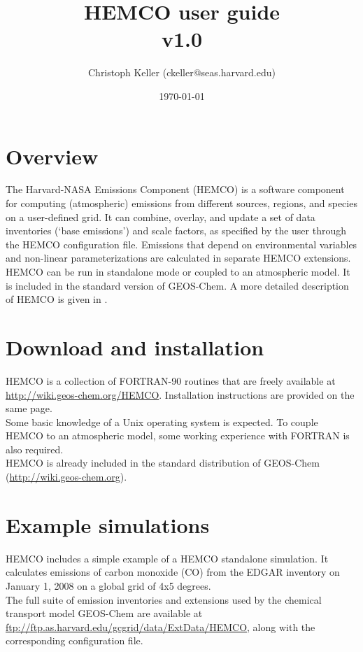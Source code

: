 \documentclass[12pt,a4paper]{article} %
\begin{document}

\title{HEMCO user guide\\v1.0}
\date{\today}
\author{Christoph Keller (ckeller@seas.harvard.edu)}

\maketitle
\tableofcontents

\section{Overview} \label{Overview}
The Harvard-NASA Emissions Component (HEMCO) is a software component for computing (atmospheric) emissions from different sources, regions, and species on a user-defined grid. It can combine, overlay, and update a set of data inventories (‘base emissions’) and scale factors, as specified by the user through the HEMCO configuration file. Emissions that depend on environmental variables and non-linear parameterizations are calculated in separate HEMCO extensions. HEMCO can be run in standalone mode or coupled to an atmospheric model. It is included in the standard version of GEOS-Chem. A more detailed description of HEMCO is given in \cite{Keller_2014}.

\section{Download and installation} \label{Installation}
HEMCO is a collection of FORTRAN-90 routines that are freely available at \url{http://wiki.geos-chem.org/HEMCO}. Installation instructions are provided on the same page.\\
Some basic knowledge of a Unix operating system is expected. To couple HEMCO to an atmospheric model, some working experience with FORTRAN is also required.\\
HEMCO is already included in the standard distribution of GEOS-Chem (\url{http://wiki.geos-chem.org}).

\section{Example simulations} \label{Examples}
HEMCO includes a simple example of a HEMCO standalone simulation. It calculates emissions of carbon monoxide (CO) from the EDGAR inventory \citep{Janssens_EDGAR_2010} on January 1, 2008 on a global grid of 4x5 degrees.\\
The full suite of emission inventories and extensions used by the chemical transport model GEOS-Chem are available at \url{ftp://ftp.as.harvard.edu/gcgrid/data/ExtData/HEMCO}, along with the corresponding configuration file.
\end{document}
